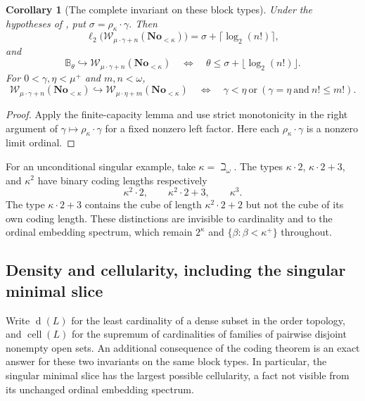 \documentclass[11pt]{article}
\newtheorem{corollary}[corollary]{Corollary}
\theoremstyle{definition}
\theoremstyle{remark}
\newcommand{\No}{\mathbf{No}}
\newcommand{\WO}{\mathcal W}
\newcommand{\B}{\mathbb B}
\newcommand{\bl}{\ell_2}
\newcommand{\emb}{\hookrightarrow}
\newcommand{\dens}{\operatorname{d}}
\newcommand{\cell}{\operatorname{cell}}
\begin{document}
\begin{corollary}[The complete invariant on these block types]
\label{swo:cb:new:cor:block-invariants}
Under the hypotheses of , put
$\sigma=\rho_\kappa\cdot\gamma$.  Then
\[
 \bl\bigl(\WO_{\mu\cdot\gamma+n}(\No_{<\kappa})\bigr)
       =\sigma+\lceil\log_2(n!)\rceil,
\]
and
\[
 \B_\theta\emb\WO_{\mu\cdot\gamma+n}(\No_{<\kappa})
 \quad\Longleftrightarrow\quad
 \theta\leq\sigma+\lfloor\log_2(n!)\rfloor.
\]
For $0<\gamma,\eta<\mu^+$ and $m,n<\omega$,
\[
 \WO_{\mu\cdot\gamma+n}(\No_{<\kappa})
      \emb\WO_{\mu\cdot\eta+m}(\No_{<\kappa})
 \quad\Longleftrightarrow\quad
 \gamma<\eta\ \text{or}\
       (\gamma=\eta\ \text{and}\ n!\leq m!).
\]
\end{corollary}
\begin{proof}
Apply the finite-capacity lemma and use strict monotonicity in the right
argument of $\gamma\mapsto \rho_\kappa\cdot\gamma$ for a fixed
nonzero left factor.  Here each $\rho_\kappa\cdot\gamma$ is a nonzero
limit ordinal.
\end{proof}

For an unconditional singular example, take $\kappa=\beth_\omega$.
The types $\kappa\cdot2$, $\kappa\cdot2+3$, and $\kappa^2$ have
binary coding lengths respectively
\[
 \kappa^2\cdot2,\qquad \kappa^2\cdot2+3,\qquad \kappa^3.
\]
The type $\kappa\cdot2+3$ contains the cube of length
$\kappa^2\cdot2+2$ but not the cube of its own coding length.
These distinctions are invisible to cardinality and to the ordinal
embedding spectrum, which remain $2^\kappa$ and
$\{\beta:\beta<\kappa^+\}$ throughout.

\subsection{Density and cellularity, including the singular minimal slice}
\label{swo:vi:sub:cb-density}

Write $\dens(L)$ for the least cardinality of a dense subset in the order
topology, and $\cell(L)$ for the supremum of cardinalities of families of
pairwise disjoint nonempty open sets.  An additional consequence of the
coding theorem is an exact answer for these two invariants on the same
block types.  In particular, the singular minimal slice has the largest
possible cellularity, a fact not visible from its unchanged ordinal
embedding spectrum.
\end{document}
